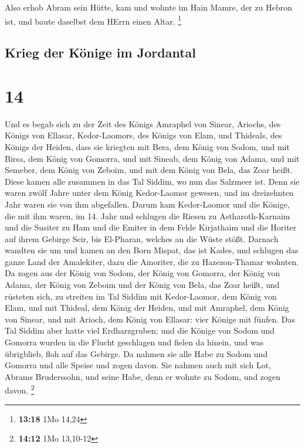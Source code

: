  Also erhob Abram sein Hütte, kam und wohnte im Hain
Mamre, der zu Hebron ist, und baute daselbst dem HErrn einen Altar.
\footnote{\textbf{13:18} 1Mo 14,24}

\hypertarget{krieg-der-kuxf6nige-im-jordantal}{%
\subsection{Krieg der Könige im
Jordantal}\label{krieg-der-kuxf6nige-im-jordantal}}

\hypertarget{section-13}{%
\section{14}\label{section-13}}

 Und es begab sich zu der Zeit des Königs Amraphel von
Sinear, Ariochs, des Königs von Ellasar, Kedor-Laomors, des Königs von
Elam, und Thideals, des Königs der Heiden,  dass sie
kriegten mit Bera, dem König von Sodom, und mit Birsa, dem König von
Gomorra, und mit Sineab, dem König von Adama, und mit Semeber, dem König
von Zeboim, und mit dem König von Bela, das Zoar heißt. 
Diese kamen alle zusammen in das Tal Siddim, wo nun das Salzmeer ist.
 Denn sie waren zwölf Jahre unter dem König Kedor-Laomor
gewesen, und im dreizehnten Jahr waren sie von ihm abgefallen.
 Darum kam Kedor-Laomor und die Könige, die mit ihm waren,
im 14. Jahr und schlugen die Riesen zu Astharoth-Karnaim und die Susiter
zu Ham und die Emiter in dem Felde Kirjathaim  und die
Horiter auf ihrem Gebirge Seir, bis El-Pharan, welches an die Wüste
stößt.  Darnach wandten sie um und kamen an den Born
Mispat, das ist Kades, und schlugen das ganze Land der Amalekiter, dazu
die Amoriter, die zu Hazezon-Thamar wohnten.  Da zogen aus
der König von Sodom, der König von Gomorra, der König von Adama, der
König von Zeboim und der König von Bela, das Zoar heißt, und rüsteten
sich, zu streiten im Tal Siddim  mit Kedor-Laomor, dem
König von Elam, und mit Thideal, dem König der Heiden, und mit Amraphel,
dem König von Sinear, und mit Arioch, dem König von Ellasar: vier Könige
mit fünfen.  Das Tal Siddim aber hatte viel
Erdharzgruben; und die Könige von Sodom und Gomorra wurden in die Flucht
geschlagen und fielen da hinein, und was übrigblieb, floh auf das
Gebirge.  Da nahmen sie alle Habe zu Sodom und Gomorra
und alle Speise und zogen davon.  Sie nahmen auch mit
sich Lot, Abrams Bruderssohn, und seine Habe, denn er wohnte zu Sodom,
und zogen davon. \footnote{\textbf{14:12} 1Mo 13,10-12}

